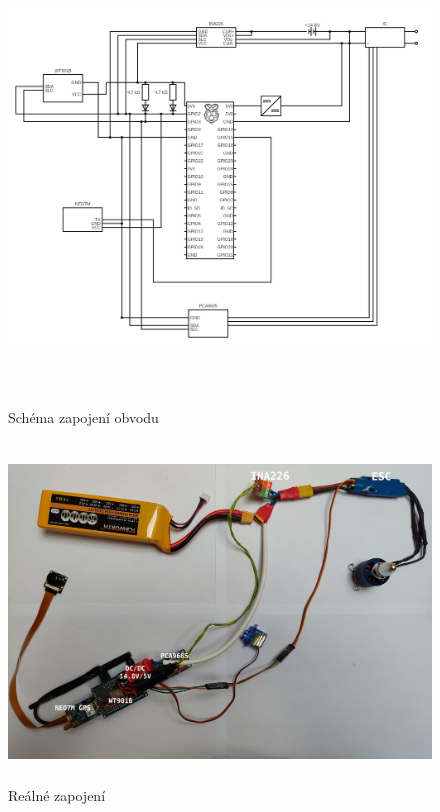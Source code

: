 \documentclass[a4paper,oneside,12pt]{report}
\begin{document}
\begin{figure}[h]
	\centering
	\includegraphics[height=12cm]{../img/schema.png}
	\caption[Schéma zapojení obvodu]{Schéma zapojení obvodu}
\end{figure}

\newpage

\begin{figure}[h]
	\centering
	\includegraphics[height=9cm]{../img/circuit.jpg}
	\caption[Reálné zapojení]{Reálné zapojení\footnotemark}
\end{figure}
\end{document}

